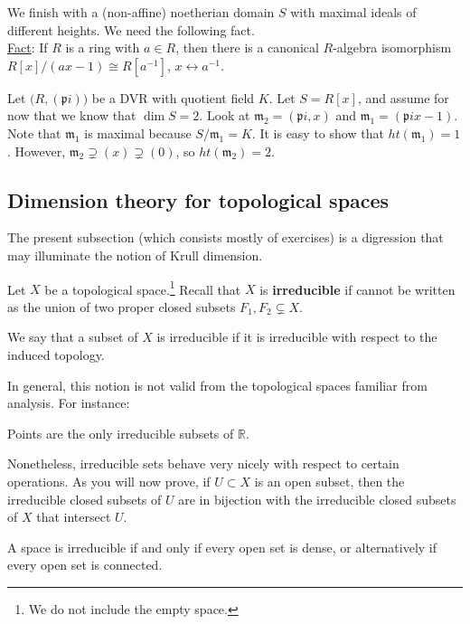  We finish with a (non-affine) noetherian domain $S$ with maximal ideals of different
 heights. We need the following fact.\\
 \underline{Fact}: If $R$ is a ring with $a\in R$, then there is a canonical $R$-algebra
 isomorphism $R[x]/(ax-1) \cong R[a^{-1}]$, $x\leftrightarrow a^{-1}$.
 \begin{example}
   Let $\bigl(R,(\mathfrak{p}i)\bigr)$ be a DVR with quotient field $K$. Let $S=R[x]$, and assume
   for now that we know that $\dim S=2$. Look at $\mathfrak{m}_2=(\mathfrak{p}i,x)$ and $\mathfrak{m}_1=(\mathfrak{p}i x-1)$.
   Note that $\mathfrak{m}_1$ is maximal because $S/\mathfrak{m}_1 = K$. It is easy to show that
   $ht(\mathfrak{m}_1)=1$. However, $\mathfrak{m}_2\supsetneq (x)\supsetneq (0)$, so $ht(\mathfrak{m}_2)=2$.
 \end{example}

\subsection{Dimension theory for topological spaces}
\label{subsectiondimension}
The present subsection (which consists mostly of exercises) is a digression   that may illuminate the notion of
Krull dimension.

\begin{definition} 
Let $X$ be a topological space.\footnote{We do not include the empty space.} Recall that $ X$ is
\textbf{irreducible} if  cannot be written as the union of
two proper closed subsets $F_1, F_2 \subsetneq X$.

We say that a subset of $X$ is irreducible if it is irreducible with respect
to the induced topology.
\end{definition} 

In general, this notion is not valid from the topological spaces familiar from
analysis. For instance:

\begin{exercise} 
Points are the only irreducible subsets of $\mathbb{R}$.
\end{exercise} 

Nonetheless, irreducible sets behave very nicely with respect to certain
operations. As you will now prove, if $U \subset X$ is an open subset, then
the irreducible closed subsets of $U$ are in bijection with the irreducible
closed subsets of $X$ that intersect $U$. 
\begin{exercise} \label{irredifeveryopenisdense}
A space is irreducible if and only if every open set is dense, or
alternatively if every open set is connected.
\end{exercise} 

